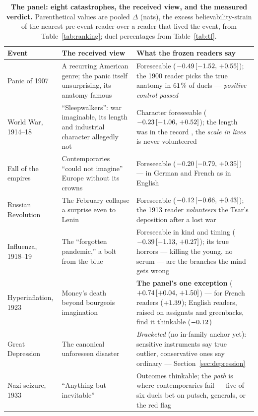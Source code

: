 \documentclass[11pt]{article}
\begin{document}
\begin{table}[t]\centering\small
\begin{tabular}{p{3.4cm}p{5.6cm}p{5.6cm}}
\toprule
Event & The received view & What the frozen readers say \\
\midrule
Panic of 1907 & A recurring American genre; the panic itself unsurprising, its anatomy famous \citep{bruner2007} & Foreseeable ($-0.49\,[-1.52,\,+0.55]$); the 1900 reader picks the true anatomy in $61$\% of duels --- \emph{positive control passed} \\
World War, 1914--18 & ``Sleepwalkers'': war imaginable, its length and industrial character allegedly not \citep{clark2012,tuchman1962} & Character foreseeable ($-0.23\,[-1.06,\,+0.52]$); the length was in the record \citep{bloch1899}, the \emph{scale in lives} is never volunteered \\
Fall of the empires & Contemporaries ``could not imagine'' Europe without its crowns & Foreseeable ($-0.20\,[-0.79,\,+0.35]$) --- in German and French as in English \\
Russian Revolution & The February collapse a surprise even to Lenin & Foreseeable ($-0.12\,[-0.66,\,+0.43]$); the 1913 reader \emph{volunteers} the Tsar's deposition after a lost war \\
Influenza, 1918--19 & The ``forgotten pandemic,'' a bolt from the blue \citep{crosby1989,barry2004} & Foreseeable in kind and timing ($-0.39\,[-1.13,\,+0.27]$); its true horrors --- killing the young, no serum --- are the branches the mind gets wrong \\
Hyperinflation, 1923 & Money's death beyond bourgeois imagination \citep{feldman1993,fergusson1975} & \textbf{The panel's one exception} ($+0.74\,[+0.04,\,+1.50]$) --- for French readers ($+1.39$); English readers, raised on assignats and greenbacks, find it thinkable ($-0.12$) \\
Great Depression & The canonical unforeseen disaster \citep{galbraith1955,kindleberger1973,friedman1963} & \emph{Bracketed} (no in-family anchor yet): sensitive instruments say true outlier, conservative ones say ordinary --- Section~\ref{sec:depression} \\
Nazi seizure, 1933 & ``Anything but inevitable'' \citep{turner1996,evans2003} & Outcomes thinkable; the \emph{path} is where contemporaries fail --- five of six duels bet on putsch, generals, or the red flag \\
\bottomrule
\end{tabular}
\caption{\textbf{The panel: eight catastrophes, the received view, and the measured verdict.} Parenthetical
values are pooled $\Delta$ (nats), the excess believability-strain of the nearest pre-event reader over a
reader that lived the event, from Table~\ref{tab:ranking}; duel percentages from Table~\ref{tab:tf}.}
\label{tab:events}
\end{table}
\end{document}

